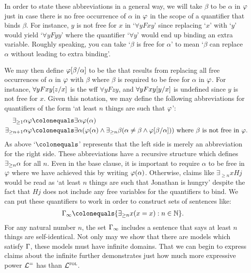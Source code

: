 In order to state these abbreviations in a general way, we will take $\beta$ to be  $\alpha$ in $\varphi$ just in case there is no free occurrence of $\alpha$ in $\varphi$ in the scope of a quantifier that binds $\beta$. 
For instance, $y$ is not free for $x$ in `$\forall y Fxy$' since replacing `$x$' with `$y$' would yield `$\forall yFyy$' where the quantifier `$\forall y$' would end up binding an extra variable.
Roughly speaking, you can take `$\beta$ is free for $\alpha$' to mean `$\beta$ can replace $\alpha$ without leading to extra binding'.

We may then define $\varphi[\beta/\alpha]$ to be the  that results from replacing all free occurrences of $\alpha$ in $\varphi$ with $\beta$ where $\beta$ is required to be free for $\alpha$ in $\varphi$. 
For instance, $\forall yFxy[z/x]$ is the wff $\forall yFzy$, and $\forall yFxy[y/x]$ is undefined since $y$ is not free for $x$.
Given this notation, we may define the following abbreviations for quantifiers of the form `at least $n$ things are such that $\varphi$':
\begin{align*}
  \qt{\exists_{\geq 1}}{\alpha}\metaA &\colonequals \qt{\exists}{\alpha}\metaA(\alpha)\\ 
  \qt{\exists_{\geq n+1}}{\alpha}\metaA &\colonequals \qt{\exists}{\alpha}(\metaA(\alpha) \eand \qt{\exists_{\geq n}}{\beta}(\alpha \neq \beta \eand \metaA\unisub{\beta}{\alpha})) \text{ where } \beta \text{ is not free in } \metaA.
\end{align*}
As above `$\colonequals$' represents that the left side is merely an abbreviation for the right side. 
These abbreviations have a recursive structure which defines $\exists_{\geq n} \alpha$ for all $n$.
Even in the base clause, it is important to require $\alpha$ to be free in $\varphi$ where we have achieved this by writing $\varphi(\alpha)$.
Otherwise, claims like $\exists_{\geq n} x Hj$ would be read as `at least $n$ things are such that Jonathan is hungry' despite the fact that $Hj$ does not include any free variables for the quantifiers to bind. 
We can put these quantifiers to work in order to construct sets of sentences like:
\begin{align*}
  \MetaG_{\infty} &\colonequals \set{\qt{\exists_{\geq n}}{x}(x=x): n\in\mathbb{N}}.
\end{align*}
For any natural number $n$, the set $\Gamma_\infty$ includes a sentence that says at least $n$ things are self-identical.
Not only may we show that there are models which satisfy $\Gamma$, these models must have infinite domains.
That we can begin to express claims about the infinite further demonstrates just how much more expressive power $\mathcal{L}^{=}$ has than $\mathcal{L}^{\textsc{fol}}$. 

